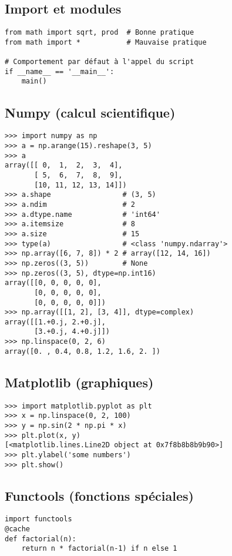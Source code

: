 \documentclass{article}
\begin{document}
\begin{multicols*}{4}
\section*{Import et modules}
\begin{lstlisting}
from math import sqrt, prod  # Bonne pratique
from math import *           # Mauvaise pratique

# Comportement par défaut à l'appel du script
if __name__ == '__main__':
    main()
\end{lstlisting}

\subsection*{Numpy (calcul scientifique)}
\begin{lstlisting}
>>> import numpy as np
>>> a = np.arange(15).reshape(3, 5)
>>> a
array([[ 0,  1,  2,  3,  4],
       [ 5,  6,  7,  8,  9],
       [10, 11, 12, 13, 14]])
>>> a.shape                 # (3, 5)
>>> a.ndim                  # 2
>>> a.dtype.name            # 'int64'
>>> a.itemsize              # 8
>>> a.size                  # 15
>>> type(a)                 # <class 'numpy.ndarray'>
>>> np.array([6, 7, 8]) * 2 # array([12, 14, 16])
>>> np.zeros((3, 5))        # None
>>> np.zeros((3, 5), dtype=np.int16)
array([[0, 0, 0, 0, 0],
       [0, 0, 0, 0, 0],
       [0, 0, 0, 0, 0]])
>>> np.array([[1, 2], [3, 4]], dtype=complex)
array([[1.+0.j, 2.+0.j],
       [3.+0.j, 4.+0.j]])
>>> np.linspace(0, 2, 6)
array([0. , 0.4, 0.8, 1.2, 1.6, 2. ])
\end{lstlisting}

\subsection*{Matplotlib (graphiques)}
\begin{lstlisting}
>>> import matplotlib.pyplot as plt
>>> x = np.linspace(0, 2, 100)
>>> y = np.sin(2 * np.pi * x)
>>> plt.plot(x, y)
[<matplotlib.lines.Line2D object at 0x7f8b8b8b9b90>]
>>> plt.ylabel('some numbers')
>>> plt.show()
\end{lstlisting}

\subsection*{Functools (fonctions spéciales)}
\begin{lstlisting}
import functools
@cache
def factorial(n):
    return n * factorial(n-1) if n else 1


\end{lstlisting}
\end{multicols*}
\end{document}
